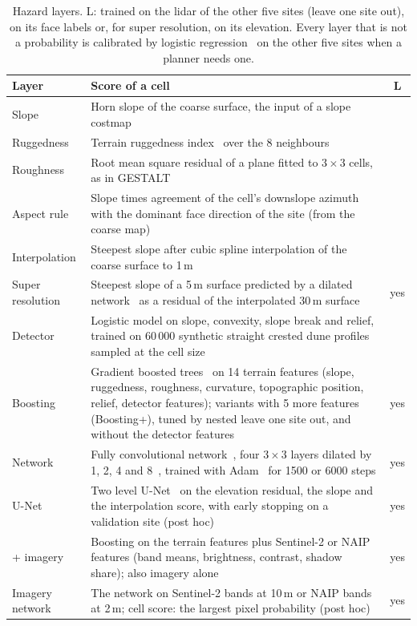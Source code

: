 \begin{table}[t]
\caption{Hazard layers. L: trained on the lidar of the other five sites (leave one site out), on its face labels or, for super resolution, on its elevation. Every layer that is not a probability is calibrated by logistic regression~\cite{platt1999} on the other five sites when a planner needs one.}
\label{tab:methods}
\centering\scriptsize
\setlength{\tabcolsep}{2.5pt}
\begin{tabular}{@{}lp{}c@{}}
\toprule
Layer & Score of a cell & L \\
\midrule
Slope & Horn slope of the coarse surface, the input of a slope costmap & \\
Ruggedness & Terrain ruggedness index~\cite{riley1999} over the 8 neighbours & \\
Roughness & Root mean square residual of a plane fitted to $3\times3$ cells, as in GESTALT~\cite{goldberg2002} & \\
Aspect rule & Slope times agreement of the cell's downslope azimuth with the dominant face direction of the site (from the coarse map) & \\
Interpolation & Steepest slope after cubic spline interpolation of the coarse surface to 1\,m & \\
Super resolution & Steepest slope of a 5\,m surface predicted by a dilated network~\cite{yu2016} as a residual of the interpolated 30\,m surface & yes \\
Detector & Logistic model on slope, convexity, slope break and relief, trained on 60\,000 synthetic straight crested dune profiles sampled at the cell size & \\
Boosting & Gradient boosted trees~\cite{friedman2001,ke2017,pedregosa2011} on 14 terrain features (slope, ruggedness, roughness, curvature, topographic position, relief, detector features); variants with 5 more features (Boosting+), tuned by nested leave one site out, and without the detector features & yes \\
Network & Fully convolutional network~\cite{long2015fully}, four $3\times3$ layers dilated by 1, 2, 4 and 8~\cite{yu2016}, trained with Adam~\cite{kingma2015adam} for 1500 or 6000 steps & yes \\
U-Net & Two level U-Net~\cite{ronneberger2015unet} on the elevation residual, the slope and the interpolation score, with early stopping on a validation site (post hoc) & yes \\
+ imagery & Boosting on the terrain features plus Sentinel-2 or NAIP features (band means, brightness, contrast, shadow share); also imagery alone & yes \\
Imagery network & The network on Sentinel-2 bands at 10\,m or NAIP bands at 2\,m; cell score: the largest pixel probability (post hoc) & yes \\
\bottomrule
\end{tabular}
\end{table}
